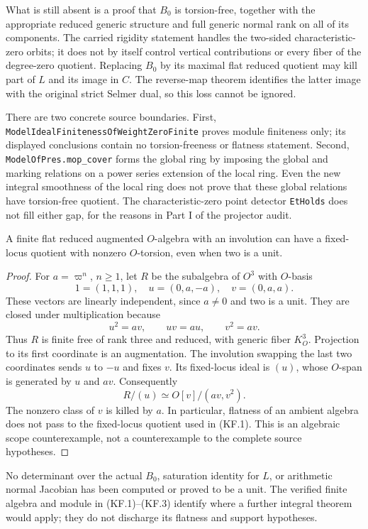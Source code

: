 What is still absent is a proof that $B_0$ is
torsion-free, together with the appropriate reduced
generic structure and full generic normal rank on all
of its components.  The carried rigidity statement
handles the two-sided characteristic-zero orbits; it
does not by itself control vertical contributions or
every fiber of the degree-zero quotient.  Replacing
$B_0$ by its maximal flat reduced quotient may kill
part of $L$ and its image in $C$.  The reverse-map
theorem identifies the latter image with the original
strict Selmer dual, so this loss cannot be ignored.

There are two concrete source boundaries.  First,
\texttt{ModelIdealFinitenessOfWeightZeroFinite} proves
module finiteness only; its displayed conclusions
contain no torsion-freeness or flatness statement.
Second, \texttt{ModelOfPres.mop\_cover} forms the
global ring by imposing the global and marking
relations on a power series extension of the local
ring.  Even the new integral smoothness of the local
ring does not prove that these global relations have
torsion-free quotient.  The characteristic-zero
point detector \texttt{EtHolds} does not fill either
gap, for the reasons in Part I of the projector audit.

\begin{lemma}
A finite flat reduced augmented $O$-algebra with an
involution can have a fixed-locus quotient with
nonzero $O$-torsion, even when two is a unit.
\end{lemma}
\begin{proof}
For $a=\varpi^n$, $n\geq1$, let $R$ be the subalgebra
of $O^3$ with $O$-basis
\[
  1=(1,1,1),\quad u=(0,a,-a),\quad v=(0,a,a).
                                                                  \tag{KF.4}
\]
These vectors are linearly independent, since $a\ne0$
and two is a unit.  They are closed under
multiplication because
\[
                u^2=av,\qquad uv=au,\qquad v^2=av.          \tag{KF.5}
\]
Thus $R$ is finite free of rank three and reduced,
with generic fiber $K_O^3$.  Projection to its first
coordinate is an augmentation.  The involution
swapping the last two coordinates sends $u$ to
$-u$ and fixes $v$.  Its fixed-locus ideal is $(u)$,
whose $O$-span is generated by $u$ and $av$.
Consequently
\[
                  R/(u)\simeq O[v]/(av,v^2).               \tag{KF.6}
\]
The nonzero class of $v$ is killed by $a$.  In
particular, flatness of an ambient algebra does not
pass to the fixed-locus quotient used in (KF.1).
This is an algebraic scope counterexample, not a
counterexample to the complete source hypotheses.
\end{proof}

No determinant over the actual $B_0$, saturation
identity for $L$, or arithmetic normal Jacobian has
been computed or proved to be a unit.  The verified
finite algebra and module in (KF.1)--(KF.3) identify
where a further integral theorem would apply; they
do not discharge its flatness and support hypotheses.
